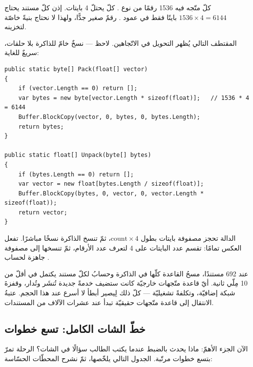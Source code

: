 \begin{idea}
كلّ متّجه فيه 1536 رقمًا من نوع . كلّ  يحتلّ 4 بايتات. إذن كلّ
مستند يحتاج $1536 \times 4 = 6144$ بايتًا فقط في عمود . رقمٌ صغير جدًّا،
ولهذا لا نحتاج بنيةً خاصّة لتخزينه.
\end{idea}

المقتطف التالي يُظهر التحويل في الاتّجاهين. لاحظ  — نسخٌ خامّ
للذاكرة بلا حلقات، سريعٌ للغاية:

\begin{english}
\begin{lstlisting}[language={[Sharp]C}]
public static byte[] Pack(float[] vector)
{
    if (vector.Length == 0) return [];
    var bytes = new byte[vector.Length * sizeof(float)];   // 1536 * 4 = 6144
    Buffer.BlockCopy(vector, 0, bytes, 0, bytes.Length);
    return bytes;
}

public static float[] Unpack(byte[] bytes)
{
    if (bytes.Length == 0) return [];
    var vector = new float[bytes.Length / sizeof(float)];
    Buffer.BlockCopy(bytes, 0, vector, 0, vector.Length * sizeof(float));
    return vector;
}
\end{lstlisting}
\end{english}

الدالة  تحجز مصفوفة بايتات بطول $\text{count} \times 4$، ثمّ تنسخ
الذاكرة نسخًا مباشرًا.  تفعل العكس تمامًا: تقسم عدد البايتات على 4 لتعرف
عدد الأرقام، ثمّ تنسخها إلى مصفوفة  جاهزة لحساب .

\begin{why}
عند 692 مستندًا، مسحُ القاعدة كلّها في الذاكرة وحسابُ  لكلّ مستند يكتمل في
أقلّ من 10 مِلّي ثانية. أيّ قاعدة متّجهات خارجيّة كانت ستضيف خدمةً جديدة تُنشَر
وتُدار، وقفزةَ شبكة إضافيّة، وتكلفةً تشغيليّة — كلّ ذلك لِيصير أبطأ لا أسرع عند هذا
الحجم. عتبةُ الانتقال إلى قاعدة متّجهات حقيقيّة تبدأ عند عشرات الآلاف من المستندات.
\end{why}

\subsection{خطّ الشات الكامل: تسع خطوات}

الآن الجزء الأهمّ: ماذا يحدث بالضبط عندما يكتب الطالب سؤالًا في الشات؟ الرحلة تمرّ
بتسع خطوات مرتّبة. الجدول التالي يلخّصها، ثمّ نشرح المحطّات الحسّاسة:

